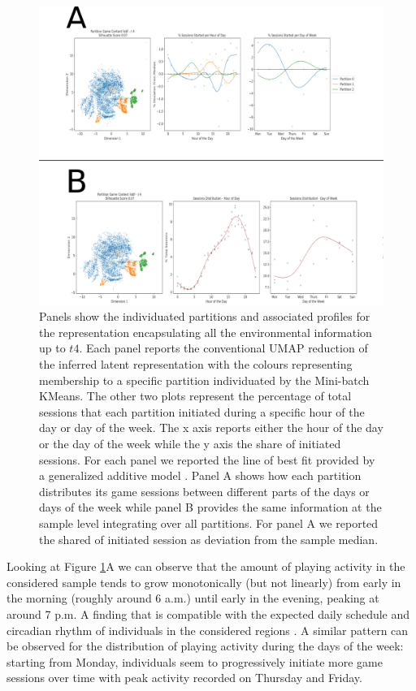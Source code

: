 \begin{figure}[ht]
\includegraphics[width=\textwidth]{images/chapter_4/clust_env.png}
\centering
\caption[Partitions of the representations generated by the RNN architectures from the environmental metrics]{Panels show the individuated partitions and associated profiles for the representation encapsulating all the environmental information up to $t4$. Each panel reports the conventional UMAP reduction of the inferred latent representation with the colours representing membership to a specific partition individuated by the Mini-batch KMeans. The other two plots represent the percentage of total sessions that each partition initiated during a specific hour of the day or day of the week. The x axis reports either the hour of the day or the day of the week while the y axis the share of initiated sessions. For each panel we reported the line of best fit provided by a generalized additive model \cite{serven2018}. Panel A shows how each partition distributes its game sessions between different parts of the days or days of the week while panel B provides the same information at the sample level integrating over all partitions. For panel A we reported the shared of initiated session as deviation from the sample median.}
\label{partition_rnn_env} 
\end{figure}

Looking at Figure \ref{partition_rnn_env}A we can observe that the amount of playing activity in the considered sample tends to grow monotonically (but not linearly) from early in the morning (roughly around 6 a.m.) until early in the evening, peaking at around 7 p.m. A finding that is compatible with the expected daily schedule and circadian rhythm of individuals in the considered regions \cite{vitaterna2001overview}. A similar pattern can be observed for the distribution of playing activity during the days of the week: starting from Monday, individuals seem to progressively initiate more game sessions over time with peak activity recorded on Thursday and Friday. 

